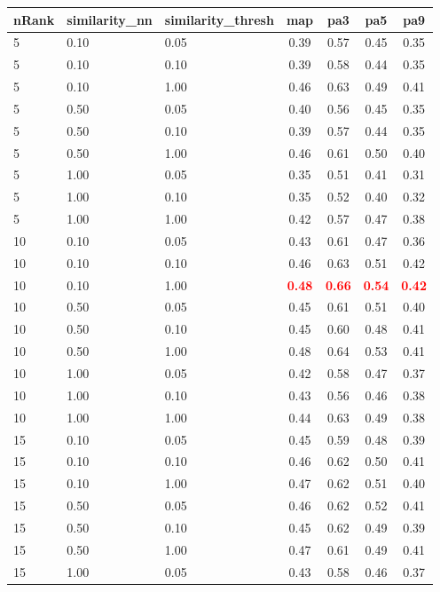   
\begin{table} 
\begin{center} 
\scriptsize 
 \setlength{\tabcolsep}{.16667em} 
\begin{tabular}{lllcccc} 
nRank & similarity\_nn & similarity\_thresh & map & pa3 & pa5 & pa9 \\ 
\hline 
 5 & 0.10 & 0.05 & 0.39 & 0.57 & 0.45 & 0.35 \\ 
 5 & 0.10 & 0.10 & 0.39 & 0.58 & 0.44 & 0.35 \\ 
 5 & 0.10 & 1.00 & 0.46 & 0.63 & 0.49 & 0.41 \\ 
 5 & 0.50 & 0.05 & 0.40 & 0.56 & 0.45 & 0.35 \\ 
 5 & 0.50 & 0.10 & 0.39 & 0.57 & 0.44 & 0.35 \\ 
 5 & 0.50 & 1.00 & 0.46 & 0.61 & 0.50 & 0.40 \\ 
 5 & 1.00 & 0.05 & 0.35 & 0.51 & 0.41 & 0.31 \\ 
 5 & 1.00 & 0.10 & 0.35 & 0.52 & 0.40 & 0.32 \\ 
 5 & 1.00 & 1.00 & 0.42 & 0.57 & 0.47 & 0.38 \\ 
10 & 0.10 & 0.05 & 0.43 & 0.61 & 0.47 & 0.36 \\ 
10 & 0.10 & 0.10 & 0.46 & 0.63 & 0.51 & 0.42 \\ 
10 & 0.10 & 1.00 & \textbf{\textcolor{red}{0.48}} & \textbf{\textcolor{red}{0.66}} & \textbf{\textcolor{red}{0.54}} & \textbf{\textcolor{red}{0.42}} \\ 
10 & 0.50 & 0.05 & 0.45 & 0.61 & 0.51 & 0.40 \\ 
10 & 0.50 & 0.10 & 0.45 & 0.60 & 0.48 & 0.41 \\ 
10 & 0.50 & 1.00 & 0.48 & 0.64 & 0.53 & 0.41 \\ 
10 & 1.00 & 0.05 & 0.42 & 0.58 & 0.47 & 0.37 \\ 
10 & 1.00 & 0.10 & 0.43 & 0.56 & 0.46 & 0.38 \\ 
10 & 1.00 & 1.00 & 0.44 & 0.63 & 0.49 & 0.38 \\ 
15 & 0.10 & 0.05 & 0.45 & 0.59 & 0.48 & 0.39 \\ 
15 & 0.10 & 0.10 & 0.46 & 0.62 & 0.50 & 0.41 \\ 
15 & 0.10 & 1.00 & 0.47 & 0.62 & 0.51 & 0.40 \\ 
15 & 0.50 & 0.05 & 0.46 & 0.62 & 0.52 & 0.41 \\ 
15 & 0.50 & 0.10 & 0.45 & 0.62 & 0.49 & 0.39 \\ 
15 & 0.50 & 1.00 & 0.47 & 0.61 & 0.49 & 0.41 \\ 
15 & 1.00 & 0.05 & 0.43 & 0.58 & 0.46 & 0.37 \\ 

\end{tabular}
\end{center}
\end{table}
